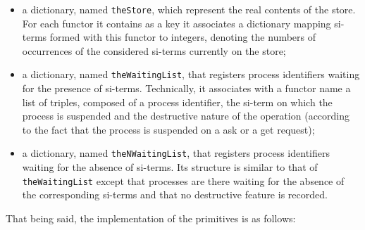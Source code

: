 \begin{sloppypar}
\begin{itemize}

\item a dictionary, named \texttt{theStore}, which represent the real
  contents of the store. For each functor it contains as a key it
  associates a dictionary mapping si-terms formed with this functor to
  integers, denoting the numbers of occurrences of the considered si-terms
  currently on the store;

\item a dictionary, named \texttt{theWaitingList}, that registers
  process identifiers waiting for the presence of
  si-terms. Technically, it associates with a functor name a list of
  triples, composed of a process identifier, the si-term on
  which the process is suspended and the destructive nature of the operation 
  (according to the fact that the process is suspended on a ask or a get request);

\item a dictionary, named \texttt{theNWaitingList}, that registers
  process identifiers waiting for the absence of si-terms. Its
  structure is similar to that of \texttt{theWaitingList} except that
  processes are there waiting for the absence of the corresponding
  si-terms and that no destructive feature is recorded.

\end{itemize}
\end{sloppypar}

\noindent
That being said, the implementation of the primitives is as follows:

